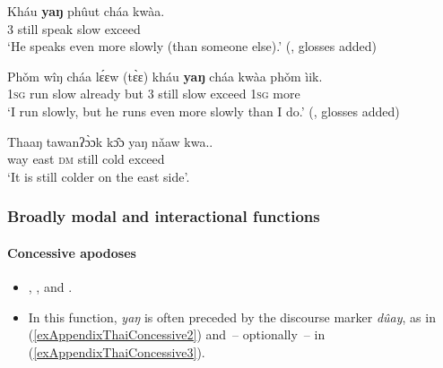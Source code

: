 \begin{exe}
	\ex\label{exAppendixThaiComparison1}
	\gll Kháu	\textbf{yaŋ}	phûut		cháa	kwàa.\\
3 still speak slow exceed\\
	\glt \lq He speaks even more slowly (than someone else).' (\cite[190]{Noss1964}, glosses added)

	\ex\label{exAppendixThaiComparison2}
	\gll Phǒm	wîŋ	cháa	lɛ́ɛw		\textup{(}tɛ̀ɛ\textup{)}	kháu	\textbf{yaŋ}	cháa	kwàa		phǒm		ìik.\\
1\textsc{sg} run slow already \phantom{(}but 3 still slow exceed 1\textsc{sg} more\\
	\glt \lq I run slowly, but he runs even more slowly than I do.' (\cite[240]{HigbieThinsan2002}, glosses added)

	\ex\label{exAppendixThaiComparison3}
	 \gll Thaaŋ		tawanʔɔ̀ɔk	kɔ̂ɔ	yaŋ		nǎaw		kwa..\\
way	east	\textsc{dm} still	cold exceed\\
	\glt \lq It is still colder on the east side'. \parencite[21]{Zhang2017}
\end{exe}

\subsubsection{Broadly modal and interactional functions}

\paragraph{Concessive apodoses}
\label{appendixThaiConcessiveConsequent}
\begin{itemize}
	\item \textcite[107–108]{HigbieThinsan2002}, \textcite{Jenny2001}, and \textcite[182]{Noss1964}.
	\item In this function, \textit{yaŋ} is often preceded by the discourse marker \textit{dûay}, as in (\ref{exAppendixThaiConcessive2}) and~-- optionally~-- in (\ref{exAppendixThaiConcessive3}).
\end{itemize}

